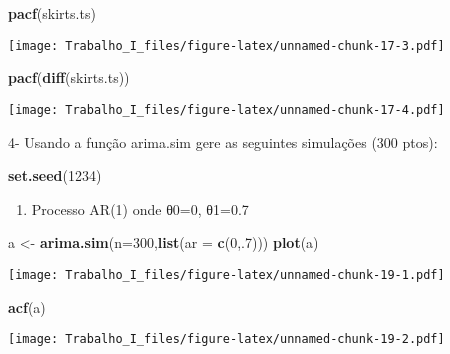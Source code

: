 \documentclass[]{article}
\newenvironment{Shaded}{\begin{snugshade}}{\end{snugshade}}
\newcommand{\KeywordTok}[1]{\textcolor[rgb]{0.13,0.29,0.53}{\textbf{#1}}}
\newcommand{\DataTypeTok}[1]{\textcolor[rgb]{0.13,0.29,0.53}{#1}}
\newcommand{\DecValTok}[1]{\textcolor[rgb]{0.00,0.00,0.81}{#1}}
\newcommand{\StringTok}[1]{\textcolor[rgb]{0.31,0.60,0.02}{#1}}
\newcommand{\NormalTok}[1]{#1}
\providecommand{\tightlist}{%
  \setlength{\itemsep}{0pt}\setlength{\parskip}{0pt}}
\begin{document}
\begin{Shaded}
\begin{Highlighting}[]
\KeywordTok{pacf}\NormalTok{(skirts.ts)}
\end{Highlighting}
\end{Shaded}

\texttt{[image: Trabalho\_I\_files/figure-latex/unnamed-chunk-17-3.pdf]}

\begin{Shaded}
\begin{Highlighting}[]
\KeywordTok{pacf}\NormalTok{(}\KeywordTok{diff}\NormalTok{(skirts.ts))}
\end{Highlighting}
\end{Shaded}

\texttt{[image: Trabalho\_I\_files/figure-latex/unnamed-chunk-17-4.pdf]}

4- Usando a função arima.sim gere as seguintes simulações (300 ptos):

\begin{Shaded}
\begin{Highlighting}[]
\KeywordTok{set.seed}\NormalTok{(}\DecValTok{1234}\NormalTok{)}
\end{Highlighting}
\end{Shaded}

\begin{enumerate}
\def\labelenumi{\alph{enumi})}
\tightlist
\item
  Processo AR(1) onde θ0=0, θ1=0.7
\end{enumerate}

\begin{Shaded}
\begin{Highlighting}[]
\NormalTok{a <-}\StringTok{ }\KeywordTok{arima.sim}\NormalTok{(}\DataTypeTok{n=}\DecValTok{300}\NormalTok{,}\KeywordTok{list}\NormalTok{(}\DataTypeTok{ar =} \KeywordTok{c}\NormalTok{(}\DecValTok{0}\NormalTok{,.}\DecValTok{7}\NormalTok{)))}
\KeywordTok{plot}\NormalTok{(a)}
\end{Highlighting}
\end{Shaded}

\texttt{[image: Trabalho\_I\_files/figure-latex/unnamed-chunk-19-1.pdf]}

\begin{Shaded}
\begin{Highlighting}[]
\KeywordTok{acf}\NormalTok{(a)}
\end{Highlighting}
\end{Shaded}

\texttt{[image: Trabalho\_I\_files/figure-latex/unnamed-chunk-19-2.pdf]}
\end{document}
